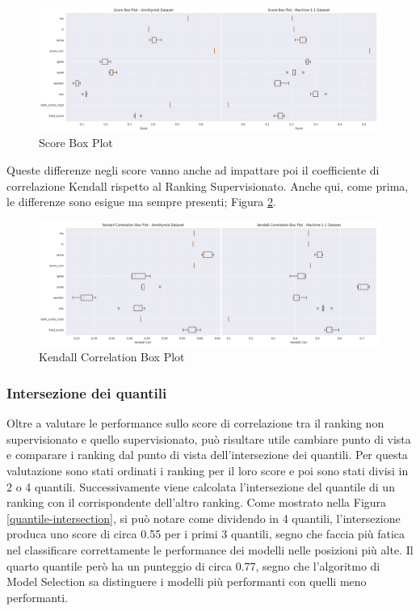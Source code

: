 \begin{figure}[t]
	\centering
	\includegraphics[width=15cm, scale=1]{images/score_box}
	\caption{Score Box Plot}
	\label{score-box}
	
\end{figure}

Queste differenze negli score vanno anche ad impattare poi il coefficiente di correlazione Kendall rispetto al Ranking Supervisionato. Anche qui, come prima, le differenze sono esigue ma sempre presenti; Figura \ref{kendall-box}.

\begin{figure}[t]
	\centering
	\includegraphics[width=15cm, scale=1]{images/kendall_box}
	\caption{Kendall Correlation Box Plot}
	\label{kendall-box}
		
\end{figure}


\subsubsection{Intersezione dei quantili}
Oltre a valutare le performance sullo score di correlazione tra il ranking non supervisionato e quello supervisionato, può risultare utile cambiare punto di vista e comparare i ranking dal punto di vista dell'intersezione dei quantili.
Per questa valutazione sono stati ordinati i ranking per il loro score e poi sono stati divisi in 2 o 4 quantili. Successivamente viene calcolata l'intersezione del quantile di un ranking con il corrispondente dell'altro ranking.
Come mostrato nella Figura \ref{quantile-intersection}, si può notare come dividendo in 4 quantili, l'intersezione produca uno score di circa 0.55 per i primi 3 quantili, segno che faccia più fatica nel classificare correttamente le performance dei modelli nelle posizioni più alte. Il quarto quantile però ha un punteggio di circa 0.77, segno che l'algoritmo di Model Selection sa distinguere i modelli più performanti con quelli meno performanti.

